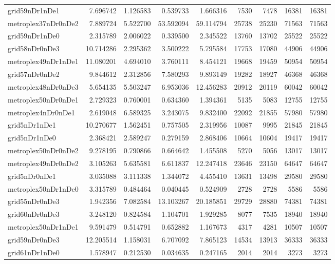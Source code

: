 \begin{longtable}{|l|r|r|r|r|r|r|r|r|}
grid59nDr1nDe1 & 7.696742 & 1.126583 & 0.539733 & 1.666316 & 7530 & 7478 & 16381 & 16381 \\
metroplex37nDr0nDe2 & 7.889724 & 5.522700 & 53.592094 & 59.114794 & 25738 & 25230 & 71563 & 71563 \\
grid59nDr1nDe0 & 2.315789 & 2.006022 & 0.339500 & 2.345522 & 13760 & 13702 & 25522 & 25522 \\
grid58nDr0nDe3 & 10.714286 & 2.295362 & 3.500222 & 5.795584 & 17753 & 17080 & 44906 & 44906 \\
metroplex49nDr1nDe1 & 11.080201 & 4.694010 & 3.760111 & 8.454121 & 19668 & 19459 & 50954 & 50954 \\
grid57nDr0nDe2 & 9.844612 & 2.312856 & 7.580293 & 9.893149 & 19282 & 18927 & 46368 & 46368 \\
metroplex48nDr0nDe3 & 5.654135 & 5.503247 & 6.953036 & 12.456283 & 20912 & 20119 & 60042 & 60042 \\
metroplex50nDr0nDe1 & 2.729323 & 0.760001 & 0.634360 & 1.394361 & 5135 & 5083 & 12755 & 12755 \\
metroplex4nDr0nDe1 & 2.619048 & 6.589325 & 3.243075 & 9.832400 & 22092 & 21855 & 57980 & 57980 \\
grid5nDr1nDe1 & 10.270677 & 1.562451 & 0.757505 & 2.319956 & 10087 & 9995 & 21845 & 21845 \\
grid5nDr1nDe0 & 2.368421 & 2.589247 & 0.279159 & 2.868406 & 10664 & 10604 & 19417 & 19417 \\
metroplex50nDr0nDe2 & 9.278195 & 0.790866 & 0.664642 & 1.455508 & 5270 & 5056 & 13017 & 13017 \\
metroplex49nDr0nDe2 & 3.105263 & 5.635581 & 6.611837 & 12.247418 & 23646 & 23150 & 64647 & 64647 \\
grid5nDr0nDe1 & 3.035088 & 3.111338 & 1.344072 & 4.455410 & 13631 & 13498 & 29580 & 29580 \\
metroplex50nDr1nDe0 & 3.315789 & 0.484464 & 0.040445 & 0.524909 & 2728 & 2728 & 5586 & 5586 \\
grid55nDr0nDe3 & 1.942356 & 7.082584 & 13.103267 & 20.185851 & 29729 & 28880 & 74381 & 74381 \\
grid60nDr0nDe3 & 3.248120 & 0.824584 & 1.104701 & 1.929285 & 8077 & 7535 & 18940 & 18940 \\
metroplex50nDr1nDe1 & 9.591479 & 0.514791 & 0.652882 & 1.167673 & 4317 & 4281 & 10507 & 10507 \\
grid59nDr0nDe3 & 12.205514 & 1.158031 & 6.707092 & 7.865123 & 14534 & 13913 & 36333 & 36333 \\
grid61nDr1nDe0 & 1.578947 & 0.212530 & 0.034635 & 0.247165 & 2014 & 2014 & 3273 & 3273 \\

\end{longtable}
